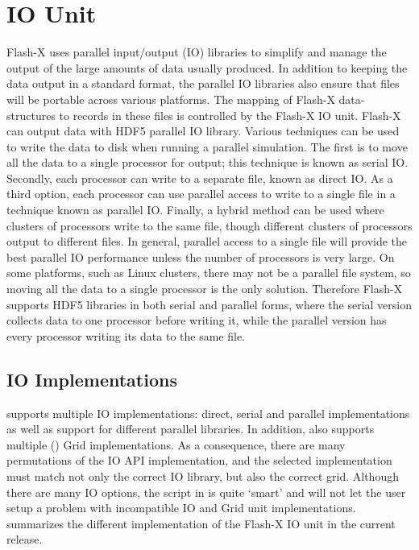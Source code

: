 \chapter{IO Unit} \label{Chp:IO}


Flash-X uses parallel input/output (IO) libraries to simplify and manage the output of
the large amounts of data usually produced. In addition to keeping the
data output in a standard format, the parallel IO libraries also
ensure that files will be portable across various platforms.  The
mapping of Flash-X data-structures to records in these files is
controlled by the Flash-X IO unit.  Flash-X can output data with 
HDF5 parallel IO library.
Various techniques can be used to write the data to disk when
running a parallel simulation.  The first is to move all the data to
a single processor for output; this technique is known as serial IO.
Secondly, each processor can write
to a separate file, known as direct IO.
As a third option, each processor can use parallel access to
write to a single file in a technique known as parallel IO. Finally,
a hybrid method can be used where clusters of processors write to 
the same file, though different clusters of processors output to 
different files.
In general, parallel access to a single file
will provide the best parallel IO performance unless the number of
processors is very large. On some platforms, such as Linux clusters,
there may not be a parallel file system, so moving all the data to a
single processor is the only solution. Therefore Flash-X supports HDF5
libraries in both serial and parallel forms, where the serial version
collects data to one processor before writing it, while the parallel
version has every processor writing its data to the same file.


\section{IO Implementations}\label{Sec:Flash-X output formats}

\flashx supports multiple IO implementations: direct, serial and parallel
implementations as well as support for different parallel libraries.
In addition, \flashx also supports multiple ()
\unit{Grid} implementations. As a consequence, there are many
permutations of the IO API implementation, and the selected
implementation must match not only the correct IO library, but also
the correct grid.  Although there are many IO options, the
 script in \flashx is quite `smart' and will not
let the user setup a problem with incompatible \unit{IO} and \unit{Grid} unit
implementations.
 summarizes the different
implementation of the Flash-X IO unit in the current release.

